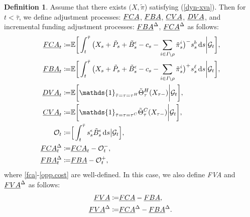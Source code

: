 \documentclass[a4paper, 11pt]{article}              %
\numberwithin{equation}{section}
\theoremstyle{plain}
\newcommand{\btau}{\bar{\tau}}
\newcommand{\1}{\mathds{1}}
\newcommand{\calG}{\mathcal{G}}
\newcommand{\calO}{\mathcal{O}}
\newcommand{\Bt}{\tilde{B}}
\newcommand{\pt}{\tilde{P}}
\newcommand{\pit}{\tilde{\pi}}
\newcommand{\dsE}{\mathbb{E}}
\newcommand{\Jt}{\tilde{\Theta}}
\newcommand{\SUM}{\displaystyle\sum}
\theoremstyle{plain}
\newtheorem{definition}[thm]{Definition}
\theoremstyle{definition}
\newtheorem{definition}{Definition}
\theoremstyle{plain}
\newcommand*\df{\mathop{}\!\mathrm{d}}
\begin{document}
\begin{definition}\label{def:xva} 
  Assume that there exists $(X, \pit$) satisfying (\ref{dyn-xva}). Then for
  $t < \btau$, we define adjustment processes: $ \emph{FCA}$, $\emph{FBA}$, $\emph{CVA}$, $\emph{DVA}$, and incremental
  funding adjustment processes: $ \emph{FBA}^\Delta$, $\emph{FCA}^\Delta$  as follows:  
\begin{align}
  \emph{FCA}_t \coloneqq
  & \dsE\bigg[\int_{t}^{\btau}\big(X_s + \pt_s +\Bt^\epsilon_s- c_s
    - \SUM_{i \in I \setminus \rho} \tilde{\pi}^i_s\big)^{-}s^{b}_s \df s\bigg\vert\calG_t\bigg],\label{fca}\\
  \emph{FBA}_t \coloneqq
  & \dsE\bigg[ \int_{t}^{\btau}\big(X_s + \pt_s +\Bt^\epsilon_s- c_s
    - \SUM_{i \in I \setminus \rho} \tilde{\pi}^i_s\big)^{+}s^{\ell}_s \df s\bigg\vert\calG_t\bigg], \label{fba}\\
  \emph{DVA}_t \coloneqq
  & \dsE\bigg[\1_{\btau = \tau=\tau^H}\Jt^H_{\tau}(X_{\tau-})\bigg\vert\calG_t\bigg],\label{dva}\\
  \emph{CVA}_t \coloneqq
  & \dsE\bigg[\1_{\btau =
    \tau=\tau^C}\Jt^C_{\tau}(X_{\tau-})\bigg\vert\calG_t\bigg], \label{cva}\\
    \calO_t \coloneqq&
    \Big[\int_{t}^{\btau}s^\epsilon_s\Bt^\epsilon_s \df s\big|\calG_t\Big], \label{opp.cost}\\
  \emph{FCA}^\Delta_t \coloneqq
  & \emph{FCA}_t - \calO_t^-,\label{fcad}\\
  \emph{FBA}^\Delta_t \coloneqq
  & \emph{FBA} - \calO_t^+, \label{fbad}
\end{align}
where \cref{fca}-\cref{opp.cost} are well-defined. In this case, we also define 
\emph{FVA} and $\emph{FVA}^\Delta$ as follows:
\begin{align}
    \emph{FVA}\coloneqq& \emph{FCA}-\emph{FBA}, \nonumber \\
  \emph{FVA}^\Delta \coloneqq& \emph{FCA}^\Delta-\emph{FBA}^\Delta. \nonumber 
\end{align}
\end{definition} 
\end{document}
